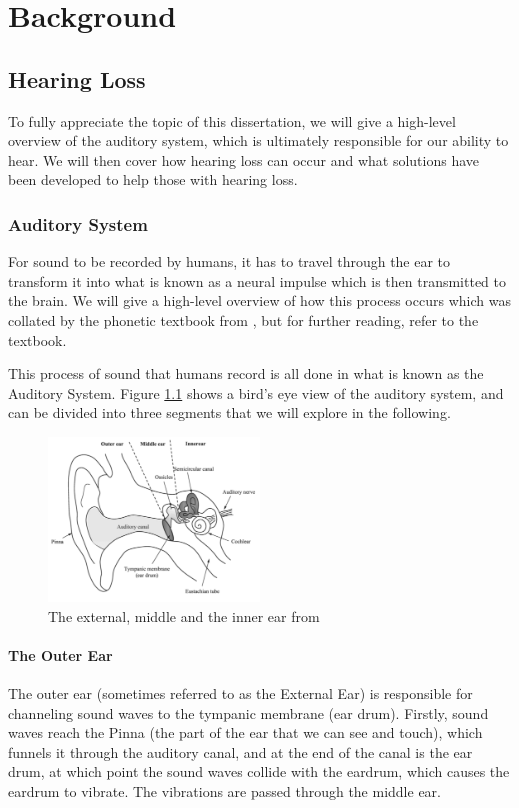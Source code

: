 \documentclass[logo,bsc,singlespacing,parskip,online]{infthesis}
\begin{document}
\chapter{Background}
\label{ch:background}

\section{Hearing Loss}
To fully appreciate the topic of this dissertation,
we will give a high-level overview of the auditory system, 
which is ultimately responsible for our ability to hear.
We will then cover how hearing loss can occur and 
what solutions have been developed to help those with hearing loss.
\subsection{Auditory System}
For sound to be recorded by humans, it has to travel through the ear to transform it into
what is known as a neural impulse which is then transmitted to the brain. We will 
give a high-level overview of how this process occurs which was collated by the phonetic textbook from \citet{Wayland2018Phonetics},
 but for further reading, refer to the textbook. 

 This process of sound that humans record is all done in what is known as the Auditory System.
 Figure \ref{fig:ear} shows a bird's eye view of the auditory system, and can be divided into three segments
 that we will explore in the following.

\begin{figure}[h]
   \centering
   \includegraphics[width=0.5\textwidth]{wayland-ear}
   \caption{The external, middle and the inner ear from \citet{Wayland2018Phonetics}}
   \label{fig:ear}
\end{figure}

\subsubsection{The Outer Ear}
The outer ear (sometimes referred to as the External Ear) is responsible for channeling sound waves to the tympanic membrane (ear drum). Firstly,
sound waves reach the Pinna (the part of the ear that we can see and touch), which funnels it through the auditory canal, and at the end of the canal 
is the ear drum, at which point the sound waves collide with the eardrum, which causes the eardrum to vibrate. 
The vibrations are passed through the middle ear.
\end{document}
